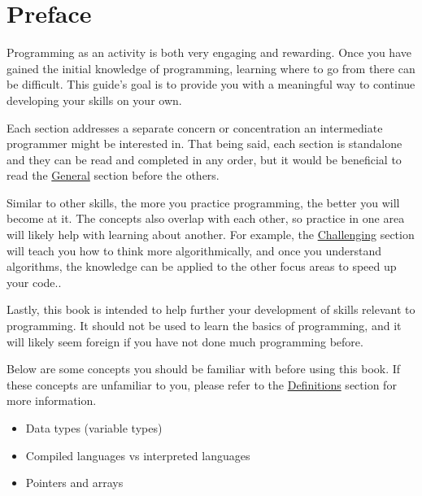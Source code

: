\documentclass[12pt, oneside, a4paper]{book}
\title{\titletext}
\date{\today}
\author{Evan Hastings}
\begin{document}
   \maketitle
   \newpage
   \tableofcontents
   \lstlistoflistings
   \listoftables

   \chapter*{Preface}
      Programming as an activity is both very engaging and rewarding.
      Once you have gained the initial knowledge of programming, learning where to go from there can be difficult.
      This guide's goal is to provide you with a meaningful way to continue developing your skills on your own.

      Each section addresses a separate concern or concentration an intermediate programmer might be interested in.
      That being said, each section is standalone and they can be read and completed in any order, but it would be beneficial to read the \hyperref[chap:general]{General} section before the others.

      Similar to other skills, the more you practice programming, the better you will become at it.
      The concepts also overlap with each other, so practice in one area will likely help with learning about another.
      For example, the \hyperref[chap:challenge]{Challenging} section will teach you how to think more algorithmically, and once you understand algorithms, the knowledge can be applied to the other focus areas to speed up your code..

      Lastly, this book is intended to help further your development of skills relevant to programming.
      It should not be used to learn the basics of programming, and it will likely seem foreign if you have not done much programming before.

      Below are some concepts you should be familiar with before using this book\footnotemark.
      If these concepts are unfamiliar to you, please refer to the \hyperref[chap:def]{Definitions} section for more information.

      \begin{itemize}
         \item Data types (variable types)
         \item Compiled languages vs interpreted languages
         \item Pointers and arrays
      \end{itemize}
\end{document}
